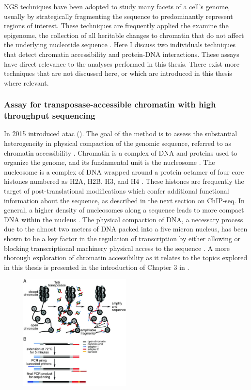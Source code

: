 NGS techniques have been adopted to study many facets of a cell's genome, usually by strategically fragmenting the sequence to predominantly represent regions of interest. These techniques are frequently applied the examine the epigenome, the collection of all heritable changes to chromatin that do not affect the underlying nucleotide sequence \cite{Allis2016}.   Here I discuss two individuals techniques that detect chromatin accessibility and protein-DNA interactions.  These assays have direct relevance to the analyses performed in this thesis. There exist more techniques that are not discussed here, or which are introduced in this thesis where relevant. 

\subsubsection{Assay for transposase-accessible chromatin with high throughput sequencing} \label{intro:atac}

In 2015 \textcite{Buenrostro2015a} introduced \gls{atac} (). The goal of the method is to assess the substantial heterogeneity in physical compaction of the genomic sequence, referred to as chromatin accessibility \cite{Thurman2012a}. Chromatin is a complex of DNA and proteins used to organize the genome, and its fundamental unit is the nucleosome \cite{Bell2011a}. The nucleosome is a complex of DNA wrapped around a protein octamer of four core histones numbered as H2A, H2B, H3, and H4 \cite{Bell2011a}. These histones are frequently the target of post-translational modifications which confer additional functional information about the sequence, as described in the next section on ChIP-seq. In general, a higher density of nucleosomes along a sequence leads to more compact DNA within the nucleus \cite{Kornberg1974}.  
The physical compaction of DNA, a necessary process due to the almost two meters of DNA packed into a five micron nucleus, has been shown to be a key factor in the regulation of transcription by either allowing or blocking transcriptional machinery physical access to the sequence \cite{Bell2011,Gross2003}. A more thorough exploration of chromatin accessibility as it relates to the topics explored in this thesis is presented in the introduction of Chapter 3 in . 

\begin{figure}
    \centering
    \includegraphics[width=0.5\textwidth]{plot/ch1/atac.jpg}
    \label{fig:atac}
\end{figure}

